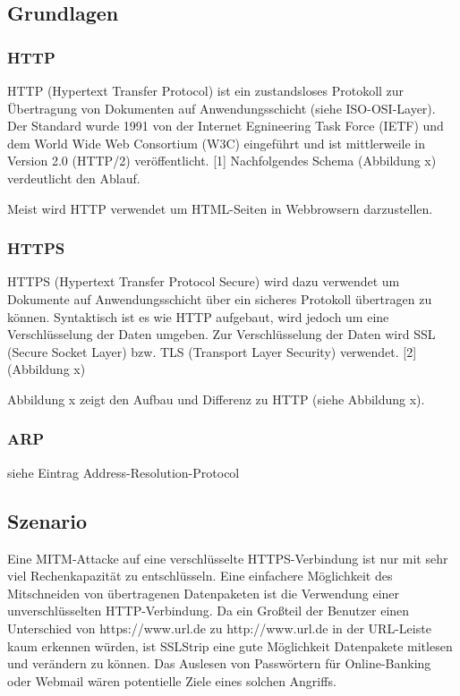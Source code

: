 \subsection*{Grundlagen}

\subsubsection*{HTTP}
HTTP (Hypertext Transfer Protocol) ist ein zustandsloses Protokoll zur Übertragung von Dokumenten auf Anwendungsschicht (siehe ISO-OSI-Layer). Der Standard wurde 1991 von der Internet Egnineering
Task Force (IETF) und dem World Wide Web Consortium (W3C) eingeführt und ist mittlerweile in Version 2.0 (HTTP/2) veröffentlicht. [1]
Nachfolgendes Schema (Abbildung x) verdeutlicht den Ablauf.

Meist wird HTTP verwendet um HTML-Seiten in Webbrowsern darzustellen.

\subsubsection*{HTTPS}
HTTPS (Hypertext Transfer Protocol Secure) wird dazu verwendet um Dokumente auf Anwendungsschicht über ein sicheres Protokoll übertragen zu können. Syntaktisch ist es wie HTTP aufgebaut,
 wird jedoch um eine Verschlüsselung der Daten umgeben. Zur Verschlüsselung der Daten wird SSL (Secure Socket Layer) bzw. TLS (Transport Layer Security) verwendet. [2]
 (Abbildung x)
 
Abbildung x zeigt den Aufbau und Differenz zu HTTP (siehe Abbildung x).

\subsubsection*{ARP}
siehe Eintrag Address-Resolution-Protocol

\subsection*{Szenario}
Eine MITM-Attacke auf eine verschlüsselte HTTPS-Verbindung ist nur mit sehr viel Rechenkapazität zu entschlüsseln. Eine einfachere Möglichkeit des Mitschneiden von übertragenen Datenpaketen ist die Verwendung einer unverschlüsselten HTTP-Verbindung. Da ein Großteil der Benutzer einen Unterschied von https://www.url.de zu http://www.url.de in der URL-Leiste kaum erkennen würden, ist SSLStrip eine gute Möglichkeit Datenpakete mitlesen und verändern zu können. \newline
Das Auslesen von Passwörtern für Online-Banking oder Webmail wären potentielle Ziele eines solchen Angriffs.

